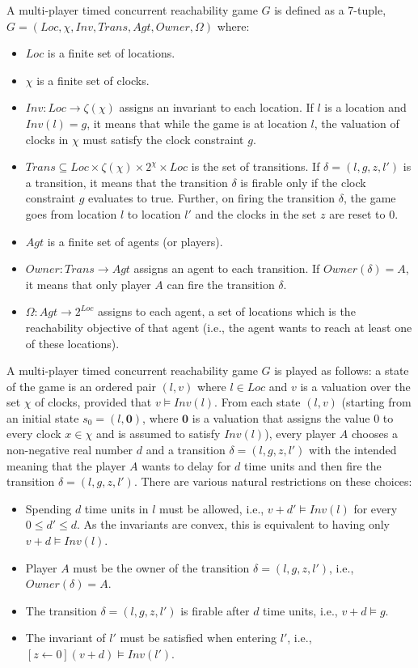 \begin{definition}
A multi-player timed concurrent reachability game $G$ is defined as a 7-tuple, $G = (Loc, \chi, Inv, Trans, Agt, Owner, \Omega)$ where:
\begin{itemize}
\item $Loc$ is a finite set of locations.
\item $\chi$ is a finite set of clocks.
\item $Inv: Loc \rightarrow \zeta(\chi)$ assigns an invariant to each location. If $l$ is a location and $Inv(l) = g$, it means that while the game is at location $l$, the valuation of clocks in $\chi$ must satisfy the clock constraint $g$.
\item $Trans \subseteq Loc \times \zeta(\chi) \times 2^{\chi} \times Loc$ is the set of transitions. If $\delta = (l, g, z, l')$ is a transition, it means that the transition $\delta$ is firable only if the clock constraint $g$ evaluates to true. Further, on firing the transition $\delta$, the game goes from location $l$ to location $l'$ and the clocks in the set $z$ are reset to $0$.
\item $Agt$ is a finite set of agents (or players).
\item $Owner: Trans \rightarrow Agt$ assigns an agent to each transition. If $Owner(\delta) = A$, it means that only player $A$ can fire the transition $\delta$.
\item $\Omega: Agt \rightarrow 2^{Loc}$ assigns to each agent, a set of locations which is the reachability objective of that agent (i.e., the agent wants to reach at least one of these locations).
\end{itemize}
\end{definition}

A multi-player timed concurrent reachability game $G$ is played as follows: a state of the game is an ordered pair $(l, v)$ where $l \in Loc$ and $v$ is a valuation over the set $\chi$ of clocks, provided that $v \models Inv(l)$. From each state $(l, v)$ (starting from an initial state $s_{0} = (l, \textbf{0})$, where $\textbf{0}$ is a valuation that assigns the value $0$ to every clock $x \in \chi$ and is assumed to satisfy $Inv(l)$), every player $A$ chooses a non-negative real number $d$ and a transition $\delta = (l, g, z, l')$ with the intended meaning that the player $A$ wants to delay for $d$ time units and then fire the transition $\delta = (l, g, z, l')$. There are various natural restrictions on these choices:
\begin{itemize}
\item Spending $d$ time units in $l$ must be allowed, i.e., $v + d' \models Inv(l)$ for every $0 \leq d' \leq d$. As the invariants are convex, this is equivalent to having only $v + d \models Inv(l)$.
\item Player $A$ must be the owner of the transition $\delta = (l, g, z, l')$, i.e., $Owner(\delta) = A$.
\item The transition $\delta = (l, g, z, l')$ is firable after $d$ time units, i.e., $v + d \models g$.
\item The invariant of $l'$ must be satisfied when entering $l'$, i.e., $[z \leftarrow 0](v + d) \models Inv(l')$.
\end{itemize}

